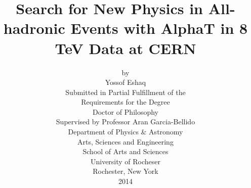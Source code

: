 \documentclass[11pt,letter,twoside,psfig,epsfig,]{article}
\newcommand{\clearemptydoublepage}{\newpage{\pagestyle{empty}\cleardoublepage}}
\begin{document}
\title{{\boldmath Search for New Physics in All-hadronic Events with AlphaT in 8 TeV Data at CERN}}

\author{
  by\\
  Yossof Eshaq\vspace{4mm}\\
  {Submitted in Partial Fulfillment of the }\\
  {Requirements for the Degree}\\
  {Doctor of Philosophy}\\[1cm]
  Supervised by Professor Aran Garcia-Bellido\\[4mm]
  Department of Physics \& Astronomy\\
  Arts, Sciences and Engineering \\
  School of Arts and Sciences\\[1cm]
  University of Rocheser\\
  Rochester, New York\\
  2014
}
\date{}
\maketitle
\clearpage





\clearemptydoublepage
\clearemptydoublepage

\clearpage
\end{document}
